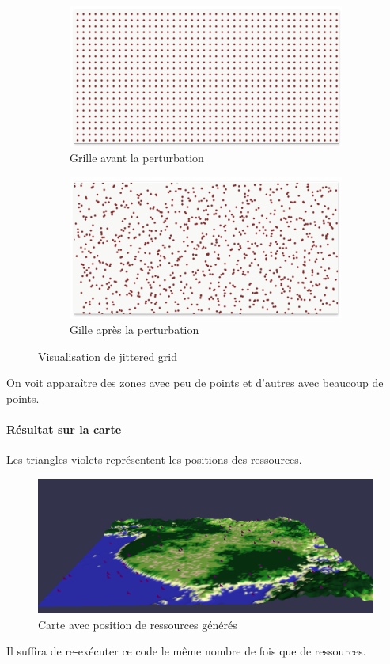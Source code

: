 \begin{figure}[!h]
    \centering
    \begin{subfigure}{0.4\linewidth}
        \centering
        \includegraphics[width=\linewidth]{images/grille.png}
        \caption{Grille avant la perturbation}
        \label{fig:image_avant_expansion}
    \end{subfigure}
    \hfill
    \begin{subfigure}{0.4\linewidth}
        \centering
        \includegraphics[width=\linewidth]{images/jitter.png}
        \caption{Gille après la perturbation}
        \label{fig:histo_avant_expansion}
    \end{subfigure}
    \caption{Visualisation de jittered grid}
\end{figure}

On voit apparaître des zones avec peu de points et d'autres avec beaucoup de points.

\paragraph{Résultat sur la carte}
Les triangles violets représentent les positions des ressources.
\begin{figure}[!h]
    \centering
    \includegraphics[width=0.5\linewidth]{images/mapjitter.png}
    \caption{Carte avec position de ressources générés}
    \label{fig:enter-label}
\end{figure}

Il suffira de re-exécuter ce code le même nombre de fois que de ressources.